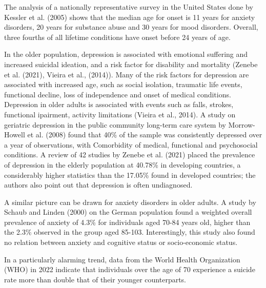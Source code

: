     The analysis of a nationally representative survey in the United States done by Kessler et al. (2005) shows that the median age for onset is 11 years for anxiety disorders, 20 years for substance abuse and 30 years for mood disorders. Overall, three fourths of all lifetime conditions have onset before 24 years of age. 

    In the older population, depression is associated with emotional suffering and increased suicidal ideation, and a risk factor for disability and mortality (Zenebe et al. (2021), Vieira et al., (2014)). Many of the risk factors for depression are associated with increased age, such as social isolation, traumatic life events, functional decline, loss of independence and onset of medical conditions. Depression in older adults is associated with events such as falls, strokes, functional ipairment, activity limitations (Vieira et al., 2014). A study on geriatric depression in the public community long-term care system by Morrow-Howell et al. (2008) found that 40\% of the sample was consistently depressed over a year of observations, with Comorbidity of medical, functional and psychosocial conditions. A review of 42 studies by Zenebe et al. (2021) placed the prevalence of depression in the elderly population at 40.78\% in developing countries, a considerably higher statistics than the 17.05\% found in developed countries; the authors also point out that depression is often undiagnosed.

    A similar picture can be drawn for anxiety disorders in older adults. A study by Schaub and Linden (2000) on the German population found a weighted overall prevalence of anxiety of 4.3\% for individuals aged 70-84 years old, higher than the 2.3\% observed in the group aged 85-103. Interestingly, this study also found no relation between anxiety and cognitive status or socio-economic status.

    In a particularly alarming trend, data from the World Health Organization (WHO) in 2022 indicate that individuals over the age of 70 experience a suicide rate more than double that of their younger counterparts.



